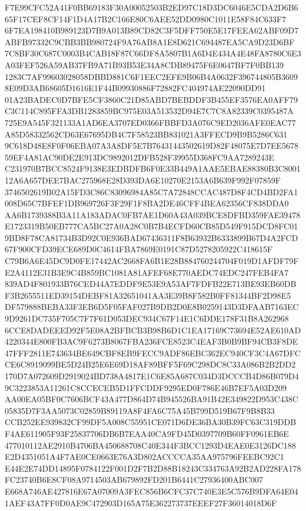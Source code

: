 \documentclass[UTF8,fontset=fandol,zihao=-4,a4paper]{ctexart}
\begin{document}
{{F7E99CFC52A41F0BB69183F30A00052503B2ED97C18D3DC6046E5CDA2D6B665F17CEF8CF14F1D4A17B2C166E80C6AEE52DD0980C1011E58F84C633F7
6F7EA198410B989123D7B9A013B89CD82C3F5DFF750E5E17FEEA62ABF09D7ABFB97332C9CBB3BB980724F9A76AB8A1E8D621C694487EA5CA9D23D6BF
7C8BF30C687C0003B4CAB18F87C66DF8A5807B1A6D4E434A4E48FA8780C6E3A03FEF526A59AB37FB9A71B93B53E34A8CDB89475F6E0647BF7F0BB139
1283C7AF99603028058DBBD881C6F1EEC2EFE9B06B4A0632F396744805B36098E09D3AB68605D1616E1F44B09930886F72882FC404974AE22090DD91
01A23BADEC0D7BFE5CF3860C21D85ABD7BEBDDF3B455EF3576EA0AFF79C3C114C895FFA3DB1283859BC975E03A513532D94E7C7C8A82339C0395487A
725E9A545F321133A1AD6EA3707ED0366FBBFD3A076C9ED2036AFE0EAC77A85D58332562CD63E67695DB4C7F58523BB831021A3FFECD9B9B5286C631
9C618D48E8F0F06EBA07A3A8DF5E7B76431443502619D82F48075E7D7EE567859EF4A81AC90DE2E913DC9892012DFB528F39955D368FC9AA7289243E
C231970B7BCC8524F9138E3EDBDFB6F0E33B449A1AAE5EBAE88380B3C800112A6A657DEE7BAC275968E28D393DA6E10270E2153A6B639F992F07859F
3746502619B02A15FD3C86C83096984A85C7A72848CCAC487D8F4CD4BD2FA1008D65C7BFEF1DB969726F3F29F1F8BA2DE46CFF4BEA62356CF838DDA0
AA6B1739388B3A11A183ADAC0FB7AE1D60A43A039BCE8DFBD359FAE39478E1723319B50EB777CA5BC27A0A28C0B7B4ECFD60CB85D549F915DCD8FC01
9BD8F78CA81734B3D92C0E936BAD67436311F8B63932B6333899B67D4A2FCD67F900CFD39ECE689D0C4614FBA7869E0191C87D5278205922C418615F
C79B6A6E45DC9D0FE17442AC2668FA6B1E28B884760244704F019D1AFDF79FE2A4112E31B3E9C4B859BC1081A81AFEF68E770AEDC74EDC247FEB4FA7
839AD4F801933B76CED44A7EDDF9E53E9A53AF7FDFB22E713BE93EB60DBF3B2655511ED39154DEBF81A32651041AA3E39B8F582B0FF81344BF2D98E5
DF579888BEBA33F3EB6D5F05FAF027B9DB2D0E8B0259143D3DFAAB7163EC9D9261DC735F705C7F7F61D053DEC934C67F14E1C6DDE178F31B8A262968
6CCE8DADEEED92F5E08A2BFBCB3B98B6D1C1EA17169C73694E52AE610AD4220344E800FB3AC9F6273B8067FBA236FCE8523C4EAF3B0B9BF94CB3F8DE
47FFF2811E743634BE649CBF8EB9FECC9ADF86EBC362EC940CF3C4A67DFCCE6C8919099BE5D24B25E6E69D18AF89BFF5F69C298DC8C33A086B2B2DD2
170D7A072609D2919024BD738A4817E1C6E85A687C034D3DCCCB4D86B079D49C3223853A11261C8CCECEB5D1FFCDDF9295ED0F786E46B7EF5A03D209
AA00EA05BF0C7606BCF43A477D864D74B945526BA91B42E349822D953C438C05835D7F3AA5073C02859B89119A8F4FA6C75A45B799D519B67F9B8B33
CCB252EE939832CF99DF5A008C55951CE071D6DE36BA30B39FC63C319DDBF4AE611905F93F25837706DB6B7EAA40CA9FD45D0397709B60FF0961EB6E
477010112AE2910B4706BA450688708C40E344F3BCC1293D4EAE0E3126DC188E2D4351051A4F7AE0CE0663E76A3D802ACCCCA35AA975796FEEBC92C1
E44E2E74DD14895F0784122F001D2F7B2D88B18243C334763A92B2AD228FA178FC23740B6E8CF08A9714503AB679892FD201B6441C27936400ABC007
E668A746AE427816E67A07009A3FEC856B6CFC37C740E3E5C576B9DFA64E041AEF43A7FF0D0AE9C472903D165A75E362273737EEEF27F36014018D6F
}}
\end{document}
